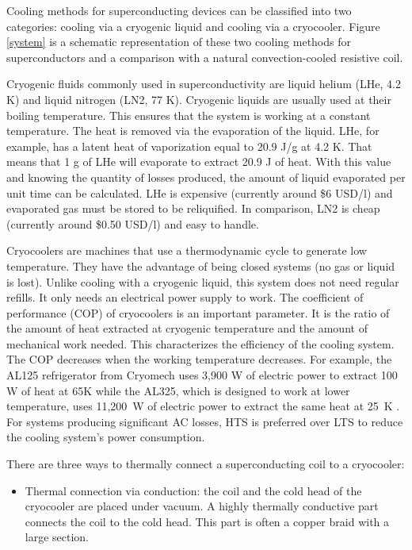 \documentclass{ws-jmrr}
\begin{document}
\begin{multicols}{2}
Cooling methods for superconducting devices can be classified into two categories: cooling via a cryogenic liquid and cooling via a cryocooler. 
 Figure \ref{system} is a schematic representation of these two cooling methods for superconductors and a comparison with a natural convection-cooled resistive coil.\par
Cryogenic fluids commonly used in superconductivity are liquid helium (LHe, 4.2 K) and liquid nitrogen (LN2, 77 K). 
 Cryogenic liquids are usually used at their boiling temperature. 
  This ensures that the system is working at a constant temperature. 
   The heat is removed via the evaporation of the liquid. 
   LHe, for example, has a latent heat of vaporization equal to 20.9 J/g at 4.2 K. 
   That means that 1 g of LHe will evaporate to extract 20.9 J of heat. 
   With this value and knowing the quantity of losses produced, the amount of liquid evaporated per unit time can be calculated. 
   LHe is expensive (currently around \$6 USD/l) and evaporated gas must be stored to be reliquified. 
   In comparison, LN2 is cheap (currently around \$0.50 USD/l) and easy to handle.\par
Cryocoolers are machines that use a thermodynamic cycle to generate low temperature. They have the advantage of being closed systems (no gas or liquid is lost). Unlike cooling with a cryogenic liquid, this system does not need regular refills. It only needs an electrical power supply to work. The coefficient of performance (COP) of cryocoolers is an important parameter. It is the ratio of the amount of heat extracted at cryogenic temperature and the amount of mechanical work needed. This characterizes the efficiency of the cooling system. The COP decreases when the working temperature decreases. For example, the AL125 refrigerator from Cryomech uses 3,900 W of electric power to extract 100 W of heat at 65K while the AL325, which is designed to work at lower temperature, uses 11,200~W of electric power to extract the same heat at 25~K \cite{WinNT}. 
 For systems producing significant AC losses, HTS is preferred over LTS to reduce the cooling system's power consumption.\par
There are three ways to thermally connect a superconducting coil to a cryocooler:
\begin{itemize}[leftmargin=*]
\item Thermal connection via conduction: the coil and the cold head of the cryocooler are placed under vacuum. A highly thermally conductive part connects the coil to the cold head. This part is often a copper braid with a large section.

\end{itemize}
\end{multicols}
\end{document}

